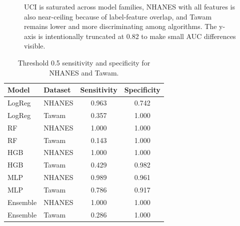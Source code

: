 \documentclass[12pt]{article}
\newcommand{\DataDir}{../outputs/latex_data}
\begin{document}
\begin{figure}[H]
\centering
{}
\caption{UCI is saturated across model families, NHANES with all features is also near-ceiling because of label-feature overlap, and Tawam remains lower and more discriminating among algorithms. The y-axis is intentionally truncated at 0.82 to make small AUC differences visible.}
\end{figure}

\begin{table}[H]
\centering
\caption{Threshold 0.5 sensitivity and specificity for NHANES and Tawam.}
\begingroup
\small
\renewcommand{\arraystretch}{1.15}
\setlength{\tabcolsep}{8pt}
\begin{tabular}{|l|l|c|c|}
\hline
Model & Dataset & Sensitivity & Specificity \\
\hline
LogReg & NHANES & 0.963 & 0.742 \\
LogReg & Tawam & 0.357 & 1.000 \\
RF & NHANES & 1.000 & 1.000 \\
RF & Tawam & 0.143 & 1.000 \\
HGB & NHANES & 1.000 & 1.000 \\
HGB & Tawam & 0.429 & 0.982 \\
MLP & NHANES & 0.989 & 0.961 \\
MLP & Tawam & 0.786 & 0.917 \\
Ensemble & NHANES & 1.000 & 1.000 \\
Ensemble & Tawam & 0.286 & 1.000 \\
\hline
\end{tabular}
\endgroup
\end{table}
\end{document}
